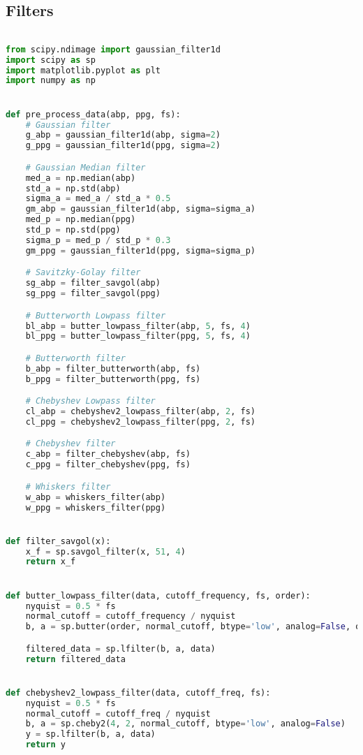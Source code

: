 \subsection{Filters}\label{subsec:code_filters}

\begin{lstlisting}[language=Python,label={lst:filters.py}, basicstyle=\scriptsize]

from scipy.ndimage import gaussian_filter1d
import scipy as sp
import matplotlib.pyplot as plt
import numpy as np


def pre_process_data(abp, ppg, fs):
    # Gaussian filter
    g_abp = gaussian_filter1d(abp, sigma=2)
    g_ppg = gaussian_filter1d(ppg, sigma=2)

    # Gaussian Median filter
    med_a = np.median(abp)
    std_a = np.std(abp)
    sigma_a = med_a / std_a * 0.5
    gm_abp = gaussian_filter1d(abp, sigma=sigma_a)
    med_p = np.median(ppg)
    std_p = np.std(ppg)
    sigma_p = med_p / std_p * 0.3
    gm_ppg = gaussian_filter1d(ppg, sigma=sigma_p)

    # Savitzky-Golay filter
    sg_abp = filter_savgol(abp)
    sg_ppg = filter_savgol(ppg)

    # Butterworth Lowpass filter
    bl_abp = butter_lowpass_filter(abp, 5, fs, 4)
    bl_ppg = butter_lowpass_filter(ppg, 5, fs, 4)

    # Butterworth filter
    b_abp = filter_butterworth(abp, fs)
    b_ppg = filter_butterworth(ppg, fs)

    # Chebyshev Lowpass filter
    cl_abp = chebyshev2_lowpass_filter(abp, 2, fs)
    cl_ppg = chebyshev2_lowpass_filter(ppg, 2, fs)

    # Chebyshev filter
    c_abp = filter_chebyshev(abp, fs)
    c_ppg = filter_chebyshev(ppg, fs)

    # Whiskers filter
    w_abp = whiskers_filter(abp)
    w_ppg = whiskers_filter(ppg)


def filter_savgol(x):
    x_f = sp.savgol_filter(x, 51, 4)
    return x_f


def butter_lowpass_filter(data, cutoff_frequency, fs, order):
    nyquist = 0.5 * fs
    normal_cutoff = cutoff_frequency / nyquist
    b, a = sp.butter(order, normal_cutoff, btype='low', analog=False, output='ba')

    filtered_data = sp.lfilter(b, a, data)
    return filtered_data


def chebyshev2_lowpass_filter(data, cutoff_freq, fs):
    nyquist = 0.5 * fs
    normal_cutoff = cutoff_freq / nyquist
    b, a = sp.cheby2(4, 2, normal_cutoff, btype='low', analog=False)
    y = sp.lfilter(b, a, data)
    return y



\end{lstlisting}
